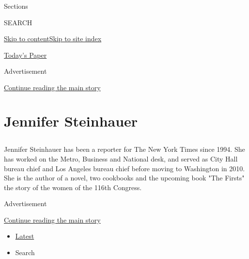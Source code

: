 Sections

SEARCH

\protect\hyperlink{site-content}{Skip to
content}\protect\hyperlink{site-index}{Skip to site index}

\href{https://myaccount.nytimes.com/auth/login?response_type=cookie\&client_id=vi}{}

\href{https://www.nytimes.com/section/todayspaper}{Today's Paper}

Advertisement

\protect\hyperlink{after-top}{Continue reading the main story}

\hypertarget{jennifer-steinhauer}{%
\section{Jennifer Steinhauer}\label{jennifer-steinhauer}}

\subsection{}

Jennifer Steinhauer has been a reporter for The New York Times since
1994. She has worked on the Metro, Business and National desk, and
served as City Hall bureau chief and Los Angeles bureau chief before
moving to Washington in 2010. She is the author of a novel, two
cookbooks and the upcoming book "The Firsts" the story of the women of
the 116th Congress.

Advertisement

\protect\hyperlink{after-mid1}{Continue reading the main story}

\begin{itemize}
\tightlist
\item
  \protect\hyperlink{stream-panel}{Latest}
\item
  Search
\end{itemize}


